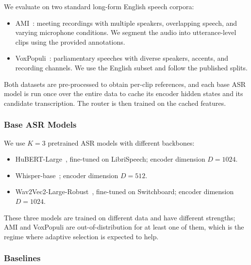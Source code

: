 \documentclass[journal]{IEEEtran}
\begin{document}
We evaluate on two standard long-form English speech corpora:
\begin{itemize}
    \item AMI~\cite{carletta2005ami}: meeting recordings with multiple
    speakers, overlapping speech, and varying microphone conditions.
    We segment the audio into utterance-level clips using the provided annotations.
    \item VoxPopuli~\cite{wang2021voxpopuli}: parliamentary speeches
    with diverse speakers, accents, and recording channels. We use
    the English subset and follow the published splits.
\end{itemize}
Both datasets are pre-processed to obtain per-clip references, and
each base ASR model is run once over the entire data to cache its
encoder hidden states and its candidate transcription. The router is
then trained on the cached features.

\subsubsection{Base ASR Models}

We use $K=3$ pretrained ASR models with different backbones:
\begin{itemize}
    \item HuBERT-Large~\cite{hsu2021hubert}, fine-tuned on
    LibriSpeech;
    encoder dimension $D=1024$.
    \item Whisper-base~\cite{radford2022whisper};
    encoder dimension $D=512$.
    \item Wav2Vec2-Large-Robust~\cite{baevski2020wav2vec}, fine-tuned
    on Switchboard;
    encoder
    dimension $D=1024$.
\end{itemize}
These three models are trained on different data and have different
strengths; AMI and VoxPopuli are out-of-distribution for at least one
of them, which is the regime where adaptive selection is expected to
help.

\subsubsection{Baselines}
\end{document}
